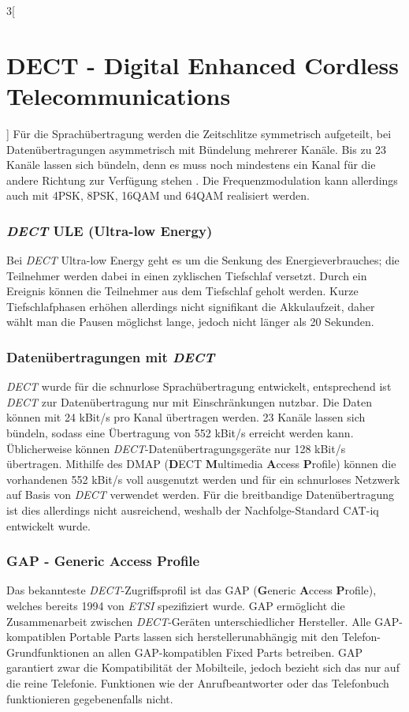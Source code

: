 \begin{multicols}{3}[\section{DECT - Digital Enhanced Cordless Telecommunications}]
Für die Sprachübertragung werden die Zeitschlitze symmetrisch aufgeteilt, bei Datenübertragungen asymmetrisch mit Bündelung mehrerer Kanäle. Bis zu 23 Kanäle lassen sich bündeln, denn es muss noch mindestens ein Kanal für die andere Richtung zur Verfügung stehen \cite{dect.1}.
Die Frequenzmodulation kann allerdings auch mit 4PSK, 8PSK, 16QAM und 64QAM realisiert werden.

\subsubsection*{\textit{DECT} ULE (Ultra-low Energy)}
Bei \textit{DECT} Ultra-low Energy geht es um die Senkung des Energieverbrauches; die Teilnehmer werden dabei in einen zyklischen Tiefschlaf versetzt. Durch ein Ereignis können die Teilnehmer aus dem Tiefschlaf geholt werden. Kurze Tiefschlafphasen erhöhen allerdings nicht signifikant die Akkulaufzeit, daher wählt man die Pausen möglichst lange, jedoch nicht länger als 20 Sekunden. \cite{dect.1}

\subsubsection*{Datenübertragungen mit \textit{DECT}}
\textit{DECT} wurde für die schnurlose Sprachübertragung entwickelt, entsprechend ist \textit{DECT} zur Datenübertragung nur mit Einschränkungen nutzbar. Die Daten können mit 24 kBit/s pro Kanal übertragen werden. 23 Kanäle lassen sich bündeln, sodass eine Übertragung von 552 kBit/s erreicht werden kann. Üblicherweise können \textit{DECT}-Datenübertragungsgeräte nur 128 kBit/s übertragen. Mithilfe des DMAP (\textbf{D}ECT \textbf{M}ultimedia \textbf{A}ccess \textbf{P}rofile) können die vorhandenen 552 kBit/s voll ausgenutzt werden und für ein schnurloses Netzwerk auf Basis von \textit{DECT} verwendet werden. Für die breitbandige Datenübertragung ist dies allerdings nicht ausreichend, weshalb der Nachfolge-Standard CAT-iq entwickelt wurde. \cite{dect.1}

\subsubsection*{GAP - Generic Access Profile}
Das bekannteste \textit{DECT}-Zugriffsprofil ist das GAP (\textbf{G}eneric \textbf{A}ccess \textbf{P}rofile), welches bereits 1994 von \textit{ETSI} spezifiziert wurde. GAP ermöglicht die Zusammenarbeit zwischen \textit{DECT}-Geräten unterschiedlicher Hersteller. Alle GAP-kompatiblen Portable Parts lassen sich herstellerunabhängig mit den Telefon-Grundfunktionen an allen GAP-kompatiblen Fixed Parts betreiben. GAP garantiert zwar die Kompatibilität der Mobilteile, jedoch bezieht sich das nur auf die reine Telefonie. Funktionen wie der Anrufbeantworter oder das Telefonbuch funktionieren gegebenenfalls nicht. \cite{dect.4,dect.1}


\end{multicols}

